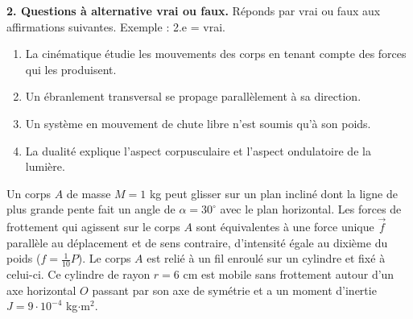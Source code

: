 \documentclass[11pt]{article}
\begin{document}
\medskip
\noindent\textbf{2. Questions à alternative vrai ou faux.} Réponds par vrai ou faux aux affirmations suivantes. Exemple : 2.e = vrai.
\begin{enumerate}[label=2.\alph*.]
  \item La cinématique étudie les mouvements des corps en tenant compte des forces qui les produisent.
  \item Un ébranlement transversal se propage parallèlement à sa direction.
  \item Un système en mouvement de chute libre n'est soumis qu'à son poids.
  \item La dualité explique l'aspect corpusculaire et l'aspect ondulatoire de la lumière.
\end{enumerate}

Un corps $A$ de masse $M = 1$ kg peut glisser sur un plan incliné dont la ligne de plus grande pente fait un angle de $\alpha = 30^\circ$ avec le plan horizontal. Les forces de frottement qui agissent sur le corps $A$ sont équivalentes à une force unique $\vec{f}$ parallèle au déplacement et de sens contraire, d'intensité égale au dixième du poids ($f = \tfrac{1}{10}P$). Le corps $A$ est relié à un fil enroulé sur un cylindre et fixé à celui-ci. Ce cylindre de rayon $r = 6$ cm est mobile sans frottement autour d'un axe horizontal $O$ passant par son axe de symétrie et a un moment d'inertie $J = 9\cdot10^{-4}$ kg$\cdot$m$^2$.

\begin{center}
\end{center}
\end{document}
